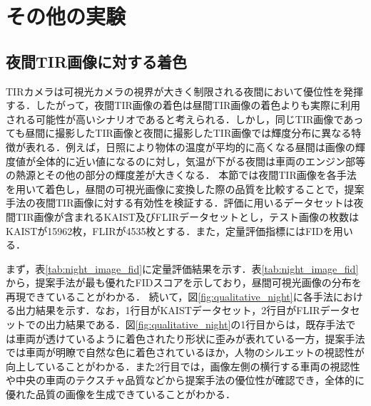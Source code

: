 \appendix
\chapter{その他の実験}
\section{夜間TIR画像に対する着色}
TIRカメラは可視光カメラの視界が大きく制限される夜間において優位性を発揮する．したがって，夜間TIR画像の着色は昼間TIR画像の着色よりも実際に利用される可能性が高いシナリオであると考えられる．しかし，同じTIR画像であっても昼間に撮影したTIR画像と夜間に撮影したTIR画像では輝度分布に異なる特徴が表れる．例えば，日照により物体の温度が平均的に高くなる昼間は画像の輝度値が全体的に近い値になるのに対し，気温が下がる夜間は車両のエンジン部等の熱源とその他の部分の輝度差が大きくなる．
本節では夜間TIR画像を各手法を用いて着色し，昼間の可視光画像に変換した際の品質を比較することで，提案手法の夜間TIR画像に対する有効性を検証する．評価に用いるデータセットは夜間TIR画像が含まれるKAIST及びFLIRデータセットとし，テスト画像の枚数はKAISTが15962枚，FLIRが4535枚とする．また，定量評価指標にはFIDを用いる．\par
まず，表\ref{tab:night_image_fid}に定量評価結果を示す．表\ref{tab:night_image_fid}から，提案手法が最も優れたFIDスコアを示しており，昼間可視光画像の分布を再現できていることがわかる．
続いて，図\ref{fig:qualitative_night}に各手法における出力結果を示す．なお，1行目がKAISTデータセット，2行目がFLIRデータセットでの出力結果である．図\ref{fig:qualitative_night}の1行目からは，既存手法では車両が透けているように着色されたり形状に歪みが表れている一方，提案手法では車両が明瞭で自然な色に着色されているほか，人物のシルエットの視認性が向上していることがわかる．また2行目では，画像左側の横行する車両の視認性や中央の車両のテクスチャ品質などから提案手法の優位性が確認でき，全体的に優れた品質の画像を生成できていることがわかる．

\begin{table}[tb]
\centering
\caption{夜間TIR画像を着色した場合の定量評価(FID)}
\label{tab:night_image_fid}
\end{table}

